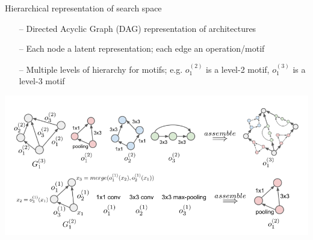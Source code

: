 \begin{frame}[c]{Hierarchical representation of search space }
\centering
\begin{itemize}
	\item[--] Directed Acyclic Graph (DAG) representation of architectures
	\item[--] Each node a latent representation; each edge an operation/motif
	\item[--] Multiple levels of hierarchy for motifs; e.g. $o_1^{(2)}$ is a level-2 motif, 
	$o_1^{(3)}$ is a level-3 motif
\end{itemize}
\includegraphics[width=\textwidth]{images_lec7/hierarchical_nas.png}\\
\end{frame}

